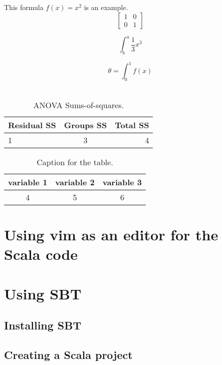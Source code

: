 \documentclass{article}
\begin{document}
This formula $f(x) = x^2$ is an example.
\begin{equation}
\left[
\begin{matrix}
1 & 0 \\
0 & 1
\end{matrix}
\right]
\end{equation}

\begin{equation}
\int^a_b\frac{1}{3}x^3
\end{equation}

\begin{equation}
\theta = \int^1_0 f(x)
\end{equation}
\\

\begin{table}[h!]
\centering
\caption{ANOVA Sums-of-squares.}
\label{tab: table1}
\begin{tabular}{l|c|r}

Residual SS & Groups SS & Total SS \\
\hline
1 & 3 & 4 \\

\end{tabular}
\end{table}

\begin{table}[h!]
\centering
\caption{Caption for the table.}
\label{tab: table2}
\begin{tabular}{ccc}
\toprule

variable 1 & variable 2 & variable 3 \\

\midrule

4 & 5 & 6 \\


\bottomrule
\end{tabular}
\end{table}


\section{Using vim as an editor for the Scala code}
\section{Using SBT}
\subsection{Installing SBT}
\subsection{Creating a Scala project}
\end{document}
